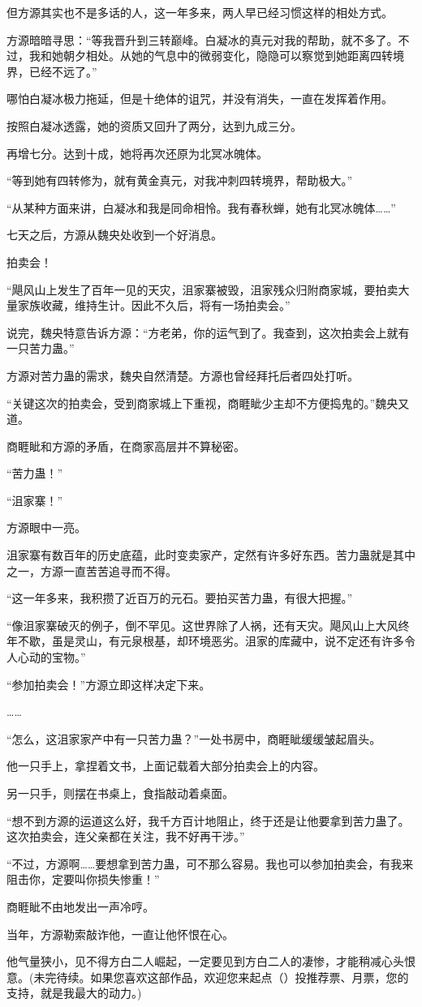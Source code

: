 \begin{this_body}
但方源其实也不是多话的人，这一年多来，两人早已经习惯这样的相处方式。

方源暗暗寻思：“等我晋升到三转巅峰。白凝冰的真元对我的帮助，就不多了。不过，我和她朝夕相处。从她的气息中的微弱变化，隐隐可以察觉到她距离四转境界，已经不远了。”

哪怕白凝冰极力拖延，但是十绝体的诅咒，并没有消失，一直在发挥着作用。

按照白凝冰透露，她的资质又回升了两分，达到九成三分。

再增七分。达到十成，她将再次还原为北冥冰魄体。

“等到她有四转修为，就有黄金真元，对我冲刺四转境界，帮助极大。”

“从某种方面来讲，白凝冰和我是同命相怜。我有春秋蝉，她有北冥冰魄体……”

七天之后，方源从魏央处收到一个好消息。

拍卖会！

“飓风山上发生了百年一见的天灾，沮家寨被毁，沮家残众归附商家城，要拍卖大量家族收藏，维持生计。因此不久后，将有一场拍卖会。”

说完，魏央特意告诉方源：“方老弟，你的运气到了。我查到，这次拍卖会上就有一只苦力蛊。”

方源对苦力蛊的需求，魏央自然清楚。方源也曾经拜托后者四处打听。

“关键这次的拍卖会，受到商家城上下重视，商睚眦少主却不方便捣鬼的。”魏央又道。

商睚眦和方源的矛盾，在商家高层并不算秘密。

“苦力蛊！”

“沮家寨！”

方源眼中一亮。

沮家寨有数百年的历史底蕴，此时变卖家产，定然有许多好东西。苦力蛊就是其中之一，方源一直苦苦追寻而不得。

“这一年多来，我积攒了近百万的元石。要拍买苦力蛊，有很大把握。”

“像沮家寨破灭的例子，倒不罕见。这世界除了人祸，还有天灾。飓风山上大风终年不歇，虽是灵山，有元泉根基，却环境恶劣。沮家的库藏中，说不定还有许多令人心动的宝物。”

“参加拍卖会！”方源立即这样决定下来。

……

“怎么，这沮家家产中有一只苦力蛊？”一处书房中，商睚眦缓缓皱起眉头。

他一只手上，拿捏着文书，上面记载着大部分拍卖会上的内容。

另一只手，则摆在书桌上，食指敲动着桌面。

“想不到方源的运道这么好，我千方百计地阻止，终于还是让他要拿到苦力蛊了。这次拍卖会，连父亲都在关注，我不好再干涉。”

“不过，方源啊……要想拿到苦力蛊，可不那么容易。我也可以参加拍卖会，有我来阻击你，定要叫你损失惨重！”

商睚眦不由地发出一声冷哼。

当年，方源勒索敲诈他，一直让他怀恨在心。

他气量狭小，见不得方白二人崛起，一定要见到方白二人的凄惨，才能稍减心头恨意。(未完待续。如果您喜欢这部作品，欢迎您来起点（）投推荐票、月票，您的支持，就是我最大的动力。)

\end{this_body}

